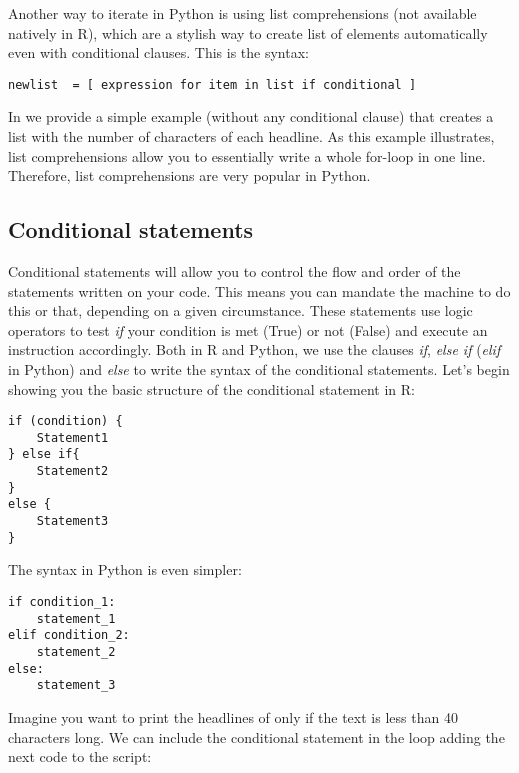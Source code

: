 Another way to iterate in Python is using list comprehensions  (not available natively in R), which are a stylish way to create list of elements automatically even with conditional clauses. This is the syntax:

\begin{verbatim}
newlist  = [ expression for item in list if conditional ]
\end{verbatim}

In  we provide a simple example (without any
conditional clause) that creates a list with the number of characters
of each headline. As this example illustrates, list comprehensions
allow you to essentially write a whole for-loop in one
line. Therefore, list comprehensions are very popular in Python.




\subsection{Conditional statements}

Conditional statements will allow you to control the flow and order of
the statements written on your code. This means you can mandate the
machine to do this or that, depending on a given circumstance. These
statements use logic operators to test \emph{if} your condition is met
(True) or not (False) and execute an instruction accordingly. Both in
R and Python, we use the clauses \emph{if}, \emph{else if}
(\emph{elif} in Python) and \emph{else} to write the syntax of the
conditional statements. Let's begin showing you the basic structure of
the conditional statement in R:

\begin{verbatim}
if (condition) {
    Statement1
} else if{
    Statement2
}
else {
    Statement3
}
\end{verbatim}

The syntax in Python is even simpler:

\begin{verbatim}
if condition_1:
    statement_1
elif condition_2:
    statement_2
else:
    statement_3
\end{verbatim}

Imagine you want to print the headlines of  only if the text is less than 40 characters long. We can include the conditional statement in the loop adding the next code to the script:

